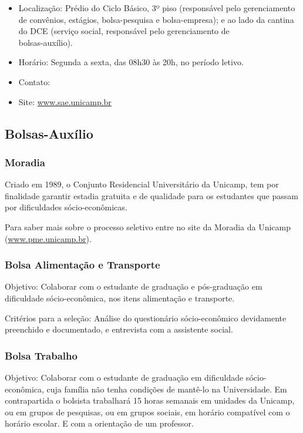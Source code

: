 \begin{itemize}
    \item  Localização: Prédio do Ciclo Básico, 3º piso (responsável pelo
        gerenciamento de convênios, estágios, bolsa-pesquisa e bolsa-empresa); e
        ao lado da cantina do DCE (serviço social, responsável pelo gerenciamento 
        de\\ bolsas-auxílio).
    \item  Horário: Segunda a sexta, das 08h30 às 20h, no período letivo.
    \item  Contato: 
    \item  Site: \url{www.sae.unicamp.br}
\end{itemize}

\subsection{Bolsas-Auxílio}
\subsubsection{Moradia}

Criado em 1989, o Conjunto Residencial Universitário da Unicamp, tem por
finalidade garantir estadia gratuita e de qualidade para os estudantes que
passam por dificuldades sócio-econômicas.

Para saber mais sobre o processo seletivo entre no site da Moradia da Unicamp
(\url{www.pme.unicamp.br}).

\subsubsection{Bolsa Alimentação e Transporte}

Objetivo: Colaborar com o estudante de graduação e pós-graduação em dificuldade
sócio-econômica, nos itens alimentação e transporte.

Critérios para a seleção: Análise do questionário sócio-econômico devidamente
preenchido e documentado, e entrevista com a assistente social.

\subsubsection{Bolsa Trabalho}

Objetivo: Colaborar com o estudante de graduação em dificuldade sócio-econômica,
cuja família não tenha condições de mantê-lo na Universidade. Em contrapartida o
bolsista trabalhará 15 horas semanais em unidades da Unicamp, ou em grupos de
pesquisas, ou em grupos sociais, em horário compatível com o horário escolar.  E
com a orientação de um professor.

